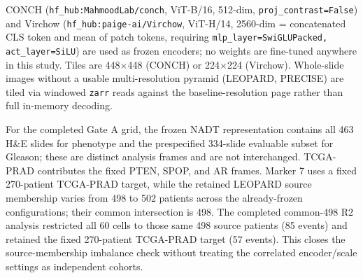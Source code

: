 CONCH (\texttt{hf\_hub:MahmoodLab/conch}, ViT-B/16, 512-dim, \texttt{proj\_contrast=False})
and Virchow (\texttt{hf\_hub:paige-ai/Virchow}, ViT-H/14, 2560-dim = concatenated CLS token
and mean of patch tokens, requiring \texttt{mlp\_layer=SwiGLUPacked, act\_layer=SiLU}) are used
as frozen encoders; no weights are fine-tuned anywhere in this study. Tiles are 448$\times$448
(CONCH) or 224$\times$224 (Virchow). Whole-slide images without a usable multi-resolution
pyramid (LEOPARD, PRECISE) are tiled via windowed \texttt{zarr} reads against the
baseline-resolution page rather than full in-memory decoding.

For the completed Gate A grid, the frozen NADT representation contains all 463 H\&E slides
for phenotype and the prespecified 334-slide evaluable subset for Gleason; these are distinct
analysis frames and are not interchanged. TCGA-PRAD contributes the fixed PTEN, SPOP, and AR
frames. Marker 7 uses a fixed 270-patient TCGA-PRAD target, while the retained LEOPARD source
membership varies from 498 to 502 patients across the already-frozen configurations; their
common intersection is 498. The completed common-498 R2 analysis restricted all 60 cells to
those same 498 source patients (85 events) and retained the fixed 270-patient TCGA-PRAD target
(57 events). This closes the source-membership imbalance check without treating the correlated
encoder/scale settings as independent cohorts.


